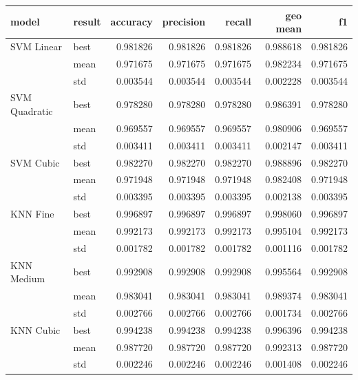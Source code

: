 \begin{table}
    \begin{tabular}{llrrrrr}
        \toprule
        model         & result & accuracy & precision & recall   & geo mean & f1       \\
        \midrule
        SVM Linear    & best   & 0.981826 & 0.981826  & 0.981826 & 0.988618 & 0.981826 \\
                      & mean   & 0.971675 & 0.971675  & 0.971675 & 0.982234 & 0.971675 \\
                      & std    & 0.003544 & 0.003544  & 0.003544 & 0.002228 & 0.003544 \\
        SVM Quadratic & best   & 0.978280 & 0.978280  & 0.978280 & 0.986391 & 0.978280 \\
                      & mean   & 0.969557 & 0.969557  & 0.969557 & 0.980906 & 0.969557 \\
                      & std    & 0.003411 & 0.003411  & 0.003411 & 0.002147 & 0.003411 \\
        SVM Cubic     & best   & 0.982270 & 0.982270  & 0.982270 & 0.988896 & 0.982270 \\
                      & mean   & 0.971948 & 0.971948  & 0.971948 & 0.982408 & 0.971948 \\
                      & std    & 0.003395 & 0.003395  & 0.003395 & 0.002138 & 0.003395 \\
        KNN Fine      & best   & 0.996897 & 0.996897  & 0.996897 & 0.998060 & 0.996897 \\
                      & mean   & 0.992173 & 0.992173  & 0.992173 & 0.995104 & 0.992173 \\
                      & std    & 0.001782 & 0.001782  & 0.001782 & 0.001116 & 0.001782 \\
        KNN Medium    & best   & 0.992908 & 0.992908  & 0.992908 & 0.995564 & 0.992908 \\
                      & mean   & 0.983041 & 0.983041  & 0.983041 & 0.989374 & 0.983041 \\
                      & std    & 0.002766 & 0.002766  & 0.002766 & 0.001734 & 0.002766 \\
        KNN Cubic     & best   & 0.994238 & 0.994238  & 0.994238 & 0.996396 & 0.994238 \\
                      & mean   & 0.987720 & 0.987720  & 0.987720 & 0.992313 & 0.987720 \\
                      & std    & 0.002246 & 0.002246  & 0.002246 & 0.001408 & 0.002246 \\

\end{tabular}
\end{table}

